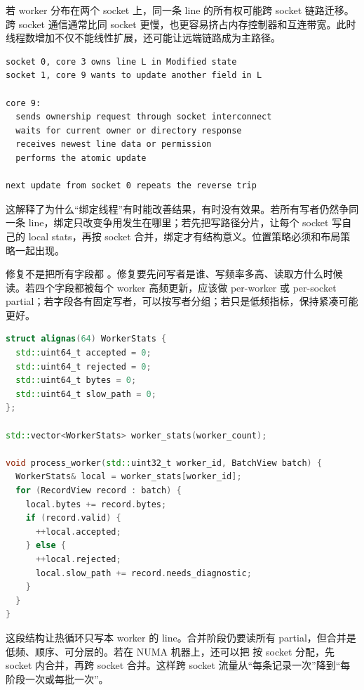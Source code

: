 若 worker 分布在两个 socket 上，同一条 line 的所有权可能跨 socket 链路迁移。跨 socket 通信通常比同 socket 更慢，也更容易挤占内存控制器和互连带宽。此时线程数增加不仅不能线性扩展，还可能让远端链路成为主路径。

\begin{lstlisting}[numbers=none,caption={跨 socket 写热点的等待形状}]
socket 0, core 3 owns line L in Modified state
socket 1, core 9 wants to update another field in L

core 9:
  sends ownership request through socket interconnect
  waits for current owner or directory response
  receives newest line data or permission
  performs the atomic update

next update from socket 0 repeats the reverse trip
\end{lstlisting}

这解释了为什么“绑定线程”有时能改善结果，有时没有效果。若所有写者仍然争同一条 line，绑定只改变争用发生在哪里；若先把写路径分片，让每个 socket 写自己的 local stats，再按 socket 合并，绑定才有结构意义。位置策略必须和布局策略一起出现。

修复不是把所有字段都 。修复要先问写者是谁、写频率多高、读取方什么时候读。若四个字段都被每个 worker 高频更新，应该做 per-worker 或 per-socket partial；若字段各有固定写者，可以按写者分组；若只是低频指标，保持紧凑可能更好。

\begin{lstlisting}[language=C++,caption={按 worker 隔离高频统计，再按阶段合并}]
struct alignas(64) WorkerStats {
  std::uint64_t accepted = 0;
  std::uint64_t rejected = 0;
  std::uint64_t bytes = 0;
  std::uint64_t slow_path = 0;
};

std::vector<WorkerStats> worker_stats(worker_count);

void process_worker(std::uint32_t worker_id, BatchView batch) {
  WorkerStats& local = worker_stats[worker_id];
  for (RecordView record : batch) {
    local.bytes += record.bytes;
    if (record.valid) {
      ++local.accepted;
    } else {
      ++local.rejected;
      local.slow_path += record.needs_diagnostic;
    }
  }
}
\end{lstlisting}

这段结构让热循环只写本 worker 的 line。合并阶段仍要读所有 partial，但合并是低频、顺序、可分层的。若在 NUMA 机器上，还可以把  按 socket 分配，先 socket 内合并，再跨 socket 合并。这样跨 socket 流量从“每条记录一次”降到“每阶段一次或每批一次”。

